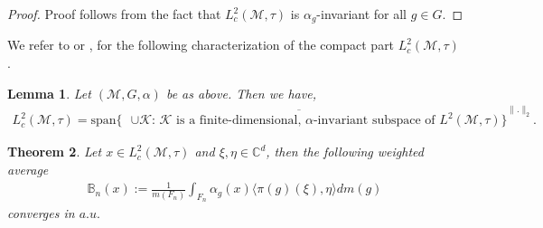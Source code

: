 \documentclass[11pt]{amsart}
\newtheorem{thm}{Theorem}[section]
\newtheorem{lem}[thm]{Lemma}
\theoremstyle{definition}
\theoremstyle{myremark}
\numberwithin{equation}{section}
\def\B{\mathbb B}
\def\C{\mathbb C}
\newcommand{\CK}{\mathcal{K}}
\newcommand{\CM}{\mathcal{M}}
\begin{document}
\begin{proof}
    Proof follows from the fact that $L_{c}^{2}(\CM,\tau)$ is $\alpha_g$-invariant for all $  g\in G $.
\end{proof}
\noindent We refer to \cite[Theorem 15.14]{Eisner2015} or \cite[Theorem 3.5]{EliGlasner}, for the following characterization of the compact part $L^2_c(\CM,\tau)$.
\begin{lem}\label{cpt_characterization}
  Let $(\CM,G,\alpha)$ be as above. Then we have,
  \begin{align*}
      L^2_c( \CM, \tau)=\overline{\text{span} \{\text{ $\cup \CK$: $\CK$ is a finite-dimensional, $\alpha$-invariant subspace of $L^2(\CM,\tau)$}\}}^{\|.\|_{2}}.
  \end{align*}
\end{lem}
\begin{thm}\label{Cpt_conv}
    Let $x \in L^2_c( \CM, \tau)$ and $\xi, \eta \in \C^d$,  then the following weighted  average 
    \begin{align}\label{Avg_1}
        \B_n(x):= \frac{1}{m(F_n)} \int_{F_n} \alpha_g(x) \langle \pi(g)(\xi), \eta \rangle dm(g)
    \end{align}
    converges in $a.u.$
\end{thm}
\end{document}
